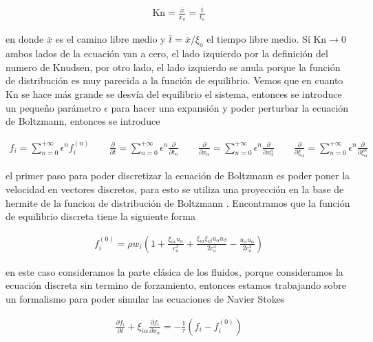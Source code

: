 \begin{eqnarray}
\label{Kn}
\text{Kn} = \frac{\overline{x}}{x_{o}}=\frac{\overline{t}}{t_{o}}
\end{eqnarray}

\noindent en donde $\overline{x}$ es el camino libre medio y $\overline{t} = \overline{x}/\xi_{o}$ el tiempo libre medio. Sí $\text{Kn}\rightarrow0$ ambos lados de la ecuación van a cero, el lado izquierdo por la definición del numero de Knudsen, por otro lado, el lado izquierdo se anula porque la función de distribución es muy parecida a la función de equilibrio. Vemos que en cuanto Kn se hace más grande se desvía del equilibrio el sistema, entonces se introduce un pequeño parámetro $\epsilon$ para hacer una expansión y poder perturbar la ecuación de Boltzmann, entonces se introduce

\begin{eqnarray}
f_{i} = \sum_{n=0}^{+\infty}\epsilon^{n}f_{i}^{(n)}\qquad \frac{\partial}{\partial t} = \sum_{n=0}^{+\infty}\epsilon^{n}\frac{\partial}{\partial t_{n}}\qquad\frac{\partial}{\partial x_{\alpha}} = \sum_{n=0}^{+\infty}\epsilon^{n}\frac{\partial}{\partial x_{\alpha}^{n}}\qquad\frac{\partial}{\partial \xi_{\alpha}} = \sum_{n=0}^{+\infty}\epsilon^{n}\frac{\partial}{\partial \xi_{\alpha}^{n}}
\end{eqnarray}

\noindent el primer paso para poder discretizar la ecuación de Boltzmann es poder poner la velocidad en vectores discretos, para esto se utiliza una proyección en la base de hermite de la funcion de distribución de Boltzmann \cite{kruger}. Encontramos que la función de equilibrio discreta tiene la siguiente forma 

\begin{eqnarray}
\label{equilibrio}
\boxed{
f_{i}^{(0)} = \rho w_{i}\left(1+\frac{\xi_{i\alpha}u_{\alpha}}{c_{o}^{2}}+\frac{\xi_{i\alpha}\xi_{i\beta}u_{\alpha}u_{\beta}}{2c_{o}^{4}}-\frac{u_{\alpha}u_{\alpha}}{2c_{o}^{2}}\right)
}
\end{eqnarray}

\noindent en este caso consideramos la parte clásica de los fluidos, porque consideramos la ecuación discreta sin termino de forzamiento, entonces estamos trabajando sobre un formalismo para poder simular las ecuaciones de Navier Stokes 

\begin{eqnarray}
\label{latticeFluidos}
\boxed{\frac{\partial f_{i}}{\partial t}+\xi_{i\alpha}\frac{\partial f_{i}}{\partial x_{\alpha}}=-\frac{1}{\tau}\left(f_{i}-f_{i}^{(0)}\right)}
\end{eqnarray}

